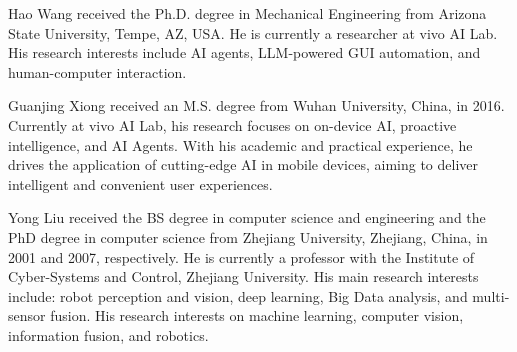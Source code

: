 \vspace{-3em}

\begin{IEEEbiography}{Hao Wang}
received the Ph.D. degree in Mechanical Engineering from Arizona State University, Tempe, AZ, USA. He is currently a researcher at vivo AI Lab. His research interests include AI agents, LLM-powered GUI automation, and human-computer interaction.
\end{IEEEbiography}

\vspace{-3em}

\begin{IEEEbiography}{Guanjing Xiong}
received an M.S. degree from Wuhan University, China, in 2016. Currently at vivo AI Lab, his research focuses on on-device AI, proactive intelligence, and AI Agents. With his academic and practical experience, he drives the application of cutting-edge AI in mobile devices, aiming to deliver intelligent and convenient user experiences.
\end{IEEEbiography}

\vspace{-3em}

\begin{IEEEbiography}{Yong Liu}
received the BS degree in computer science and engineering and the PhD degree in computer science from Zhejiang University, Zhejiang, China, in 2001 and 2007, respectively. He is currently a professor with the Institute of Cyber-Systems and Control, Zhejiang University. His main research interests include: robot perception and vision, deep learning, Big Data analysis, and multi-sensor fusion. His research interests on machine learning, computer vision, information fusion, and robotics.
\end{IEEEbiography} 

